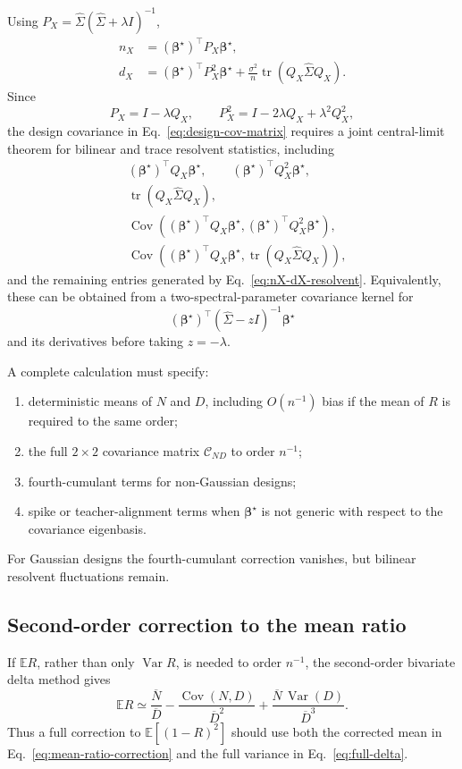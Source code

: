 \documentclass[11pt]{article}
\newcommand{\E}{\mathbb{E}}
\newcommand{\Var}{\operatorname{Var}}
\newcommand{\Cov}{\operatorname{Cov}}
\newcommand{\tr}{\operatorname{tr}}
\newcommand{\bstar}{\bm\beta^\star}
\newcommand{\Shat}{\widehat\Sigma}
\begin{document}
Using \(P_X=\Shat(\Shat+\lambda I)^{-1}\),
\begin{align}
  n_X&=(\bstar)^\top P_X\bstar,\\
  d_X&=(\bstar)^\top P_X^2\bstar
       +\frac{\sigma^2}{n}
        \tr(Q_X\Shat Q_X).
  \label{eq:nX-dX-resolvent}
\end{align}
Since
\begin{equation}
  P_X=I-\lambda Q_X,\qquad
  P_X^2=I-2\lambda Q_X+\lambda^2Q_X^2,
\end{equation}
the design covariance in Eq.~\eqref{eq:design-cov-matrix} requires a joint
central-limit theorem for bilinear and trace resolvent statistics, including
\begin{align}
  &(\bstar)^\top Q_X\bstar,\qquad
  (\bstar)^\top Q_X^2\bstar,\\
  &\tr(Q_X\Shat Q_X),\\
  &\Cov\left(
    (\bstar)^\top Q_X\bstar,
    (\bstar)^\top Q_X^2\bstar
  \right),\\
  &\Cov\left(
    (\bstar)^\top Q_X\bstar,
    \tr(Q_X\Shat Q_X)
  \right),
\end{align}
and the remaining entries generated by Eq.~\eqref{eq:nX-dX-resolvent}.
Equivalently, these can be obtained from a two-spectral-parameter covariance
kernel for
\[
(\bstar)^\top(\Shat-zI)^{-1}\bstar
\]
and its derivatives before taking \(z=-\lambda\).

A complete calculation must specify:
\begin{enumerate}
  \item deterministic means of \(N\) and \(D\), including \(O(n^{-1})\)
        bias if the mean of \(R\) is required to the same order;
  \item the full \(2\times2\) covariance matrix
        \(\mathcal C_{ND}\) to order \(n^{-1}\);
  \item fourth-cumulant terms for non-Gaussian designs;
  \item spike or teacher-alignment terms when \(\bstar\) is not generic with
        respect to the covariance eigenbasis.
\end{enumerate}
For Gaussian designs the fourth-cumulant correction vanishes, but bilinear
resolvent fluctuations remain.

\subsection{Second-order correction to the mean ratio}

If \(\E R\), rather than only \(\Var R\), is needed to order \(n^{-1}\), the
second-order bivariate delta method gives
\begin{equation}
  \E R
  \simeq
  \frac{\overline N}{\overline D}
  -\frac{\Cov(N,D)}{\overline D^2}
  +\frac{\overline N\,\Var(D)}{\overline D^3}.
  \label{eq:mean-ratio-correction}
\end{equation}
Thus a full correction to \(\E[(1-R)^2]\) should use both the corrected mean
in Eq.~\eqref{eq:mean-ratio-correction} and the full variance in
Eq.~\eqref{eq:full-delta}.
\end{document}
